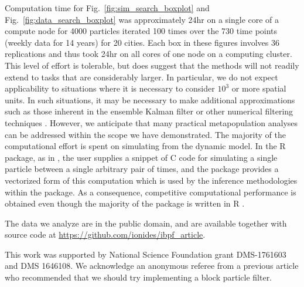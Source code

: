 \documentclass[12pt]{article}\usepackage[]{graphicx}\usepackage[]{xcolor}
\begin{document}
Computation time for Fig.~\ref{fig:sim_search_boxplot} and Fig.~\ref{fig:data_search_boxplot} was approximately 24hr on a single core of a compute node for 4000 particles iterated 100 times over the 730 time points (weekly data for 14 years) for 20 cities.
Each box in these figures involves 36 replications and thus took 24hr on all cores of one node on a computing cluster.
This level of effort is tolerable, but does suggest that the methods will not readily extend to tasks that are considerably larger. 
In particular, we do not expect applicability to situations where it is necessary to consider $10^3$ or more spatial units.
In such situations, it may be necessary to make additional approximations such as those inherent in the ensemble Kalman filter \citep{evensen09book,katzfuss19} or other numerical filtering techniques \citep{whitehouse22}.
However, we anticipate that many practical metapopulation analyses can be addressed within the scope we have demonstrated.
The majority of the computational effort is spent on simulating from the dynamic model.
In the  R package, as in , the user supplies a snippet of C code for simulating a single particle between a single arbitrary pair of times, and the package provides a vectorized form of this computation which is used by the inference methodologies within the package.
As a consequence, competitive computational performance is obtained even though the majority of the package is written in R \citep[Table~1]{FitzJohn20}.

\vspace{3mm}



\vspace{1mm}

\noindent The data we analyze are in the public domain, and are available together with source code at \url{https://github.com/ionides/ibpf_article}.

\vspace{3mm}


\vspace{1mm}

\noindent This work was supported by National Science Foundation grant DMS-1761603 and DMS 1646108.
We acknowledge an anonymous referee from a previous article who recommended that we should try implementing a block particle filter.
\end{document}
